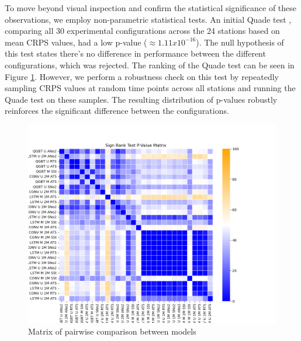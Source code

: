 \documentclass[12pt,a4paper]{book}
\begin{document}
To move beyond visual inspection and confirm the statistical significance of these observations, we employ non-parametric statistical tests. An initial Quade test \citep{garcia_advanced_2010}, comparing all 30 experimental configurations across the 24 stations based on mean CRPS values, had a low p-value ($\approx 1.11 x  10^{-16}$). The null hypothesis of this test states there's no difference in performance between the different configurations, which was rejected. The ranking of the Quade test can be seen in Figure \ref{fig:exp2a_pairwise}. However, we perform a robustness check on this test by repeatedly sampling CRPS values at random time points across all stations and running the Quade test on these samples. The resulting distribution of p-values robustly reinforces the significant difference between the configurations.

\begin{figure}[h] 
  \centering  
  \includegraphics[width=1\textwidth]{exp2a_pairwise.png}
  \caption{Matrix of pairwise comparison between models}
  \label{fig:exp2a_pairwise}
\end{figure}
\end{document}

